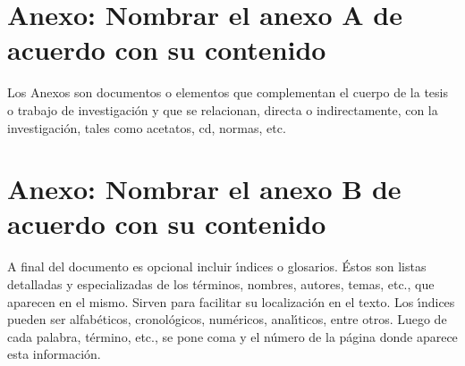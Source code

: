 \begin{appendix}
\chapter{Anexo: Nombrar el anexo A de acuerdo con su contenido}\label{AnexoA}
Los Anexos son documentos o elementos que complementan el cuerpo de la tesis o trabajo de investigaci\'{o}n y que se relacionan, directa o indirectamente, con la investigaci\'{o}n, tales como acetatos, cd, normas, etc.\\

\chapter{Anexo: Nombrar el anexo B de acuerdo con su contenido}
A final del documento es opcional incluir \'{\i}ndices o glosarios. \'{E}stos son listas detalladas y especializadas de los t\'{e}rminos, nombres, autores, temas, etc., que aparecen en el mismo. Sirven para facilitar su localizaci\'{o}n en el texto. Los \'{\i}ndices pueden ser alfab\'{e}ticos, cronol\'{o}gicos, num\'{e}ricos, anal\'{\i}ticos, entre otros. Luego de cada palabra, t\'{e}rmino, etc., se pone coma y el n\'{u}mero de la p\'{a}gina donde aparece esta informaci\'{o}n.\\


\end{appendix}